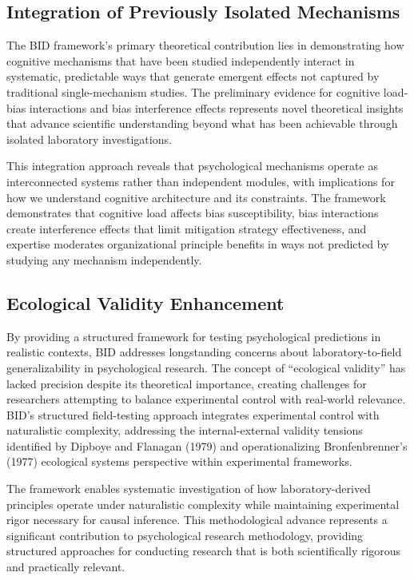 \documentclass[
  authoryear,
  preprint]{elsarticle}
\begin{document}
\subsection{Integration of Previously Isolated
Mechanisms}\label{integration-of-previously-isolated-mechanisms}

The BID framework's primary theoretical contribution lies in
demonstrating how cognitive mechanisms that have been studied
independently interact in systematic, predictable ways that generate
emergent effects not captured by traditional single-mechanism studies.
The preliminary evidence for cognitive load-bias interactions and bias
interference effects represents novel theoretical insights that advance
scientific understanding beyond what has been achievable through
isolated laboratory investigations.

This integration approach reveals that psychological mechanisms operate
as interconnected systems rather than independent modules, with
implications for how we understand cognitive architecture and its
constraints. The framework demonstrates that cognitive load affects bias
susceptibility, bias interactions create interference effects that limit
mitigation strategy effectiveness, and expertise moderates
organizational principle benefits in ways not predicted by studying any
mechanism independently.

\subsection{Ecological Validity
Enhancement}\label{ecological-validity-enhancement}

By providing a structured framework for testing psychological
predictions in realistic contexts, BID addresses longstanding concerns
about laboratory-to-field generalizability in psychological research.
The concept of ``ecological validity'' has lacked precision despite its
theoretical importance, creating challenges for researchers attempting
to balance experimental control with real-world relevance. BID's
structured field-testing approach integrates experimental control with
naturalistic complexity, addressing the internal-external validity
tensions identified by Dipboye and Flanagan (1979) and operationalizing
Bronfenbrenner's (1977) ecological systems perspective within
experimental frameworks.

The framework enables systematic investigation of how laboratory-derived
principles operate under naturalistic complexity while maintaining
experimental rigor necessary for causal inference. This methodological
advance represents a significant contribution to psychological research
methodology, providing structured approaches for conducting research
that is both scientifically rigorous and practically relevant.
\end{document}
